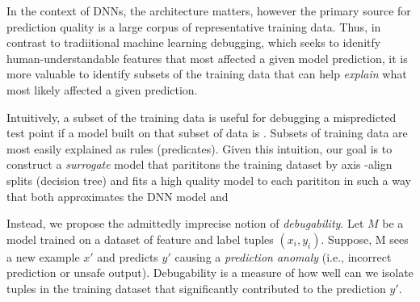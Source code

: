 In the context of DNNs, the architecture matters, however the primary source for prediction quality is a large corpus of representative training data.  
Thus, in contrast to tradiitional machine learning debugging, which seeks to idenitfy human-understandable features that most affected a given model prediction, it is more valuable to identify subsets of the training data that can help {\it explain} what most likely affected a given prediction.




Intuitively, a subset of the training data is useful for debugging a mispredicted test point if a model built on that subset of data is .  Subsets of training data are most easily explained as rules (predicates).  Given this intuition, our goal is to construct a {\it surrogate} model that parititons the training dataset by axis -align splits (decision tree) and fits a high quality model to each parititon in such a way that both approximates the DNN model and 


Instead, we propose the admittedly imprecise notion of \emph{debugability}.
Let $M$ be a model trained on a dataset of feature and label tuples $(x_i,y_i)$.
Suppose, M sees a new example $x'$ and predicts $y'$ causing a \emph{prediction anomaly} (i.e., incorrect prediction or unsafe output).
Debugability is a measure of how well can we isolate tuples in the training dataset that significantly contributed to the prediction $y'$.

